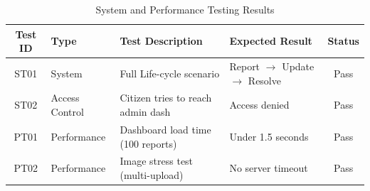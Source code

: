 \begin{table}[H]
    \centering
    \renewcommand{\arraystretch}{1.3}
    \begin{tabular}{|c|p{2.5cm}|p{4cm}|p{4cm}|c|}
        \hline
        \textbf{Test ID} & \textbf{Type} & \textbf{Test Description} & \textbf{Expected Result} & \textbf{Status} \\
        \hline
        ST01 & System & Full Life-cycle scenario & Report $\rightarrow$ Update $\rightarrow$ Resolve & Pass \\
        \hline
        ST02 & Access Control & Citizen tries to reach admin dash & Access denied & Pass \\
        \hline
        PT01 & Performance & Dashboard load time (100 reports) & Under 1.5 seconds & Pass \\
        \hline
        PT02 & Performance & Image stress test (multi-upload) & No server timeout & Pass \\
        \hline
    \end{tabular}
    \caption{System and Performance Testing Results}
\end{table}


